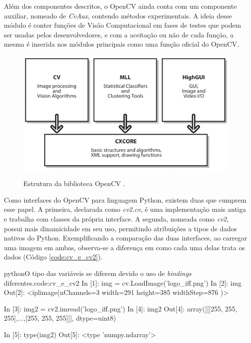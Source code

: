 Além dos componentes descritos, o OpenCV ainda conta com um componente auxiliar, nomeado de \textit{CvAux}, contendo métodos experimentais. A ideia desse módulo é conter funções de Visão Computacional em fases de testes que podem ser usadas pelos desenvolvedores, e com a aceitação ou não de cada função, a mesma é inserida nos módulos principais como uma função oficial do OpenCV.

\begin{figure}[h]
    \centering
    {\includegraphics[scale=0.75]{figuras/estrutura_opencv}}
    \caption{Estrutura da biblioteca OpenCV \cite{BRADSKI}.}
    \label{img:estrutura_opencv}
\end{figure}

Como interfaces do OpenCV para linguagem Python, existem duas que cumprem esse papel. A primeira, declarada como \textit{cv2.cv}, é uma implementação mais antiga e trabalha com classes da própria interface. A segunda, nomeada como \textit{cv2}, possui mais dinamicidade em seu uso, permitindo atribuições a tipos de dados nativos do Python. Exemplificando a comparação das duas interfaces, ao carregar uma imagem em ambas, observa-se a diferença em como cada uma delas trata os dados (Código \ref{code:cv_e_cv2}).

\begin{code}{python}{O tipo das variáveis se diferem devido o uso de \textit{bindings} diferentes.}{code:cv_e_cv2}
In [1]: img = cv.LoadImage('logo_iff.png')
In [2]: img
Out[2]: <iplimage(nChannels=3 width=291 height=385 widthStep=876 )>

In [3]: img2 = cv2.imread('logo_iff.png')
In [4]: img2
Out[4]: array([[[255, 255, 255],...,[255, 255, 255]]], dtype=uint8)

In [5]: type(img2)
Out[5]: <type 'numpy.ndarray'>
\end{code}

